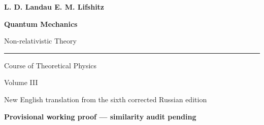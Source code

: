 \documentclass{openlandau-qm}
\begin{document}
\frontmatter
\begin{titlepage}
  \thispagestyle{empty}
  \sffamily
  \vspace*{12mm}
  {\Large\bfseries L. D. Landau \enspace E. M. Lifshitz\par}
  \vfill
  {\Huge\bfseries Quantum Mechanics\par}
  \vspace{3mm}
  {\Large Non-relativistic Theory\par}
  \vspace{8mm}
  \noindent\rule{\textwidth}{0.6pt}\par
  \vspace{4mm}
  {\large Course of Theoretical Physics\par}
  {\normalsize Volume III\par}
  \vfill
  {\small New English translation from the sixth corrected Russian edition\par}
  \vspace{2mm}
  {\small\bfseries Provisional working proof --- similarity audit pending\par}
\end{titlepage}
\tableofcontents

\mainmatter



















\backmatter

\end{document}
